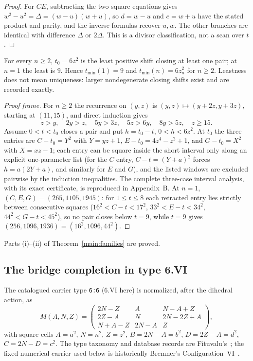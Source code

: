 \begin{proof}
For $CE$, subtracting the two square equations gives
$w^2-u^2=\Delta=(w-u)(w+u)$, so $d=w-u$ and $e=w+u$ have the stated product
and parity, and the inverse formulas recover $u,w$. The other branches are
identical with difference $\Delta$ or $2\Delta$. This is a divisor
classification, not a scan over $t$.
\end{proof}

\begin{proposition}\label{prop:leastshift}
For every $n\ge2$, $t_0=6z^2$ is the least positive shift closing at least
one pair; at $n=1$ the least is $9$. Hence $t_{\min}(1)=9$ and
$t_{\min}(n)=6z_n^2$ for $n\ge2$. Leastness does not mean uniqueness:
larger nondegenerate closing shifts exist and are recorded exactly.
\end{proposition}

\begin{proof}[Proof frame]
For $n\ge2$ the recurrence on $(y,z)$ is $(y,z)\mapsto(y+2z,y+3z)$,
starting at $(11,15)$, and direct induction gives
\[
z>y,\quad 2y>z,\quad 5y>3z,\quad 5z>6y,\quad 8y>5z,\quad z\ge15 .
\]
Assume $0<t<t_0$ closes a pair and put $h=t_0-t$, $0<h<6z^2$. At $t_0$ the
three entries are $C-t_0=Y^2$ with $Y=yz+1$, $E-t_0=4z^4-z^2+1$, and
$G-t_0=X^2$ with $X=xz-1$; each entry can be square inside the short
interval only along an explicit one-parameter list (for the $C$ entry,
$C-t=(Y+a)^2$ forces $h=a(2Y+a)$, and similarly for $E$ and $G$), and the
listed windows are excluded pairwise by the induction inequalities. The
complete three-case interval analysis, with its exact certificate, is
reproduced in Appendix~B. At $n=1$, $(C,E,G)=(265,1105,1945)$: for
$1\le t\le8$ each retracted entry lies strictly between consecutive squares
($16^2<C-t<17^2$, $33^2<E-t<34^2$, $44^2<G-t<45^2$), so no pair closes
below $t=9$, while $t=9$ gives $(256,1096,1936)=(16^2,1096,44^2)$.
\end{proof}

Parts (i)--(ii) of Theorem~\ref{main:families} are proved.

\subsection{The bridge completion in type 6.VI}

The catalogued carrier type \texttt{6:6} (6.VI here) is normalized, after
the dihedral action, as
\[
M(A,N,Z)=\begin{pmatrix}
2N-Z & A & N-A+Z\\
2Z-A & N & 2N-2Z+A\\
N+A-Z & 2N-A & Z
\end{pmatrix},
\]
with square cells $A=a^2$, $N=n^2$, $Z=z^2$, $B=2N-A=b^2$, $D=2Z-A=d^2$,
$C=2N-D=c^2$. The type taxonomy and database records are Fituvalu's~\cite{FIT}; the
fixed numerical carrier used below is historically Bremner's
Configuration~VI~\cite{BRE01}.

